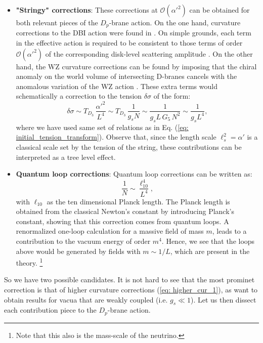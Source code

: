 \begin{itemize}
    \item \textbf{"Stringy" corrections}: These corrections at $\mathcal{O}(\alpha'^{2})$ can be obtained for both relevant pieces of the $D_{p}$-brane action. On the one hand, curvature corrections to the DBI action were found in \cite{Bachas:1999aa}. On simple grounds, each term in the effective action is required to be consistent to those terms of order $\mathcal{O}(\alpha'^{2})$ of the corresponding disk-level scattering amplitude \cite{Garousi:1996aa}. On the other hand, the WZ curvature corrections can be found by imposing that the chiral anomaly on the world volume of intersecting D-branes cancels with the anomalous variation of the WZ action \cite{Green:1997aa}. These extra terms would schematically  a correction to the tension $\delta \sigma$ of the form:
        \begin{equation}\label{eq: higher_cur_1}
            \delta \sigma \sim T_{D_3}\,\frac{\alpha'^{2}}{L^4}\sim T_{D_3}\,\frac{1}{g_s N} \sim \frac{1}{g_s L\,G_5\,N^2} \sim \frac{1}{g_s L^4},
        \end{equation}
    where we have used same set of relations as in Eq. (\ref{eq: initial_tension_transform}). Observe that, since the length scale $\ell_{s}^{2} = \alpha'$ is a classical scale set by the tension of the string, these contributions can be interpreted as a tree level effect.
    
    \item \textbf{Quantum loop corrections}: Quantum loop corrections can be written as:
        \begin{equation}
            \frac{1}{N} \sim \frac{\ell_{10}^4}{L^4} ,
        \end{equation}
    with $\ell_{10}$ as the ten dimensional Planck length. The Planck length is obtained from the classical Newton's constant by introducing Planck's constant, showing that this correction comes from quantum loops. A renormalized one-loop calculation for a massive field of mass $m$, leads to a contribution to the vacuum energy of order $m^4$. Hence, we see that the loops above would be generated by fields with $m\sim 1/L$, which are present in the theory. \footnote{Note that this also is the mass-scale of the neutrino.}
\end{itemize}
So we have two possible candidates. It is not hard to see that the most prominet correction is that of higher curvature corrections (\ref{eq: higher_cur_1}), as want to obtain results for vacua that are weakly coupled (i.e. $g_{s} \ll 1$). Let us then dissect each contribution piece to the $D_{p}$-brane action.

